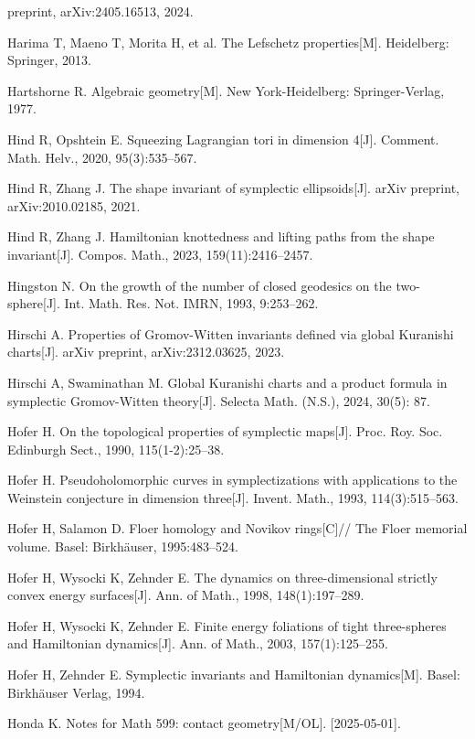 \begin{enumerate}[label={[\arabic*]},leftmargin=3.2em,itemsep=2pt,parsep=0pt]
        preprint, arXiv:2405.16513, 2024.
  \item Harima T, Maeno T, Morita H, et al. The Lefschetz properties[M]. Heidelberg:
        Springer, 2013.
  \item Hartshorne R. Algebraic geometry[M]. New York-Heidelberg: Springer-Verlag, 1977.
  \item Hind R, Opshtein E. Squeezing Lagrangian tori in dimension 4[J]. Comment. Math.
        Helv., 2020, 95(3):535--567.
  \item Hind R, Zhang J. The shape invariant of symplectic ellipsoids[J]. arXiv preprint,
        arXiv:2010.02185, 2021.
  \item Hind R, Zhang J. Hamiltonian knottedness and lifting paths from the shape
        invariant[J]. Compos. Math., 2023, 159(11):2416--2457.
  \item Hingston N. On the growth of the number of closed geodesics on the two-sphere[J].
        Int. Math. Res. Not. IMRN, 1993, 9:253--262.
  \item Hirschi A. Properties of Gromov-Witten invariants defined via global Kuranishi
        charts[J]. arXiv preprint, arXiv:2312.03625, 2023.
  \item Hirschi A, Swaminathan M. Global Kuranishi charts and a product formula in
        symplectic Gromov-Witten theory[J]. Selecta Math. (N.S.), 2024, 30(5): 87.
  \item Hofer H. On the topological properties of symplectic maps[J]. Proc. Roy. Soc.
        Edinburgh Sect., 1990, 115(1-2):25--38.
  \item Hofer H. Pseudoholomorphic curves in symplectizations with applications to the
        Weinstein conjecture in dimension three[J]. Invent. Math., 1993, 114(3):515--563.
  \item Hofer H, Salamon D. Floer homology and Novikov rings[C]// The Floer memorial
        volume. Basel: Birkhäuser, 1995:483--524.
  \item Hofer H, Wysocki K, Zehnder E. The dynamics on three-dimensional strictly convex
        energy surfaces[J]. Ann. of Math., 1998, 148(1):197--289.
  \item Hofer H, Wysocki K, Zehnder E. Finite energy foliations of tight three-spheres and
        Hamiltonian dynamics[J]. Ann. of Math., 2003, 157(1):125--255.
  \item Hofer H, Zehnder E. Symplectic invariants and Hamiltonian dynamics[M]. Basel:
        Birkhäuser Verlag, 1994.
  \item Honda K. Notes for Math 599: contact geometry[M/OL]. [2025-05-01].

\end{enumerate}
